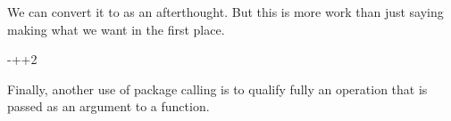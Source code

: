 \begin{xtc}
\begin{xtccomment}
We can convert it to  as an afterthought.
But this is more work than just saying making what we want in the first
place.
\end{xtccomment}
\begin{spadsrc}
\end{spadsrc}
\begin{TeXOutput}
\begin{fricasmath}{8}
-{}++2\TIMES {}\TIMES %
\TIMES \ImaginaryI %
\end{fricasmath}
\end{TeXOutput}
\end{xtc}

Finally, another use of package calling is to qualify fully an
operation that is passed as an argument to a function.

